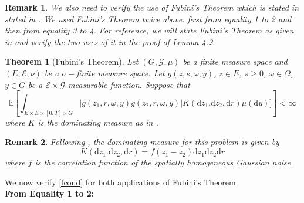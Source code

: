 \documentclass{article}
\newtheorem{theorem}{Theorem}[section]
\newtheorem{remark}{Remark}[section]
\numberwithin{equation}{section}
\newcommand{\E}{\mathbb{E}}
\newcommand{\ud}{\ensuremath{\mathrm{d}}}
\begin{document}
\begin{remark} \textit{We also need to verify the use of Fubini's Theorem which is stated in stated in \cite{Walsh}. We used Fubini's Theorem twice above: first from equality 1 to 2 and then from equality 3 to 4. For reference, we will state Fubini's Theorem as given in \cite{Walsh} and verify the two uses of it in the proof of Lemma 4.2.} 
\end{remark}

\begin{theorem}[Fubini's Theorem] \textit{Let $(G,\mathscr G, \mu)$ be a finite measure space and $(E, \mathscr E, \nu)$ be a $\sigma-$finite measure space. Let $g(z,s,\omega,y)$, $z \in E$, $s\ge0$, $\omega \in \Omega$, $y\in G$ be a $\mathscr E \times \mathscr G$ measurable function. Suppose that 
	\begin{equation} \E \left[ \int_{E\times E \times [0,T]\times G} |g(z_1,r,\omega,y)g(z_2,r,\omega,y)|K(\ud z_1. \ud z_2, \ud r)\mu(\ud y)]\right] < \infty \label{fcond}
	\end{equation} 
	where $K$ is the dominating measure as in \cite{DalangEtc09Minicourse}.} 
\end{theorem}

\begin{remark} \textit{Following \cite{DalangEtc09Minicourse}, the dominating measure for this problem is given by $$K(\ud z_1. \ud z_2, \ud r)= f(z_1-z_2)\ud z_1 \ud z_2 \ud r $$ where $f$ is the correlation function of the spatially homogeneous Gaussian noise.}
\end{remark}

We now verify \eqref{fcond} for both applications of Fubini's Theorem. \\

\noindent \textbf{From Equality 1 to 2:} \\
\end{document}
